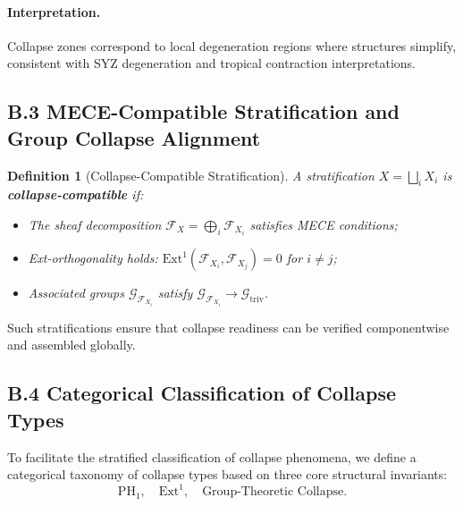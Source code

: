 \documentclass[11pt]{article}
\newtheorem{definition}[theorem]{Definition}
\begin{document}
\paragraph{Interpretation.}
Collapse zones correspond to local degeneration regions where structures simplify, consistent with SYZ degeneration and tropical contraction interpretations.

\subsection*{B.3 MECE-Compatible Stratification and Group Collapse Alignment}

\begin{definition}[Collapse-Compatible Stratification]
A stratification \( X = \bigsqcup_i X_i \) is \textbf{collapse-compatible} if:

\begin{itemize}
    \item The sheaf decomposition \( \mathcal{F}_X = \bigoplus_i \mathcal{F}_{X_i} \) satisfies MECE conditions;
    \item Ext-orthogonality holds: \( \mathrm{Ext}^1(\mathcal{F}_{X_i}, \mathcal{F}_{X_j}) = 0 \) for \( i \neq j \);
    \item Associated groups \( \mathcal{G}_{\mathcal{F}_{X_i}} \) satisfy \( \mathcal{G}_{\mathcal{F}_{X_i}} \longrightarrow \mathcal{G}_{\mathrm{triv}} \).
\end{itemize}
\end{definition}

Such stratifications ensure that collapse readiness can be verified componentwise and assembled globally.

\subsection*{B.4 Categorical Classification of Collapse Types}

To facilitate the stratified classification of collapse phenomena, we define a categorical taxonomy of collapse types based on three core structural invariants:
\[
\mathrm{PH}_1,\quad \mathrm{Ext}^1,\quad \text{Group-Theoretic Collapse}.
\]
\end{document}
